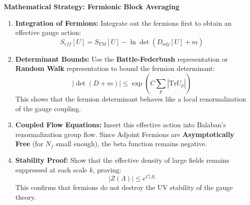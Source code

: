 \textbf{Mathematical Strategy: Fermionic Block Averaging}
\begin{enumerate}
    \item \textbf{Integration of Fermions:}
    Integrate out the fermions first to obtain an effective gauge action:
    \begin{equation}
    S_{eff}[U] = S_{YM}[U] - \ln \det(D_{adj}[U] + m)
    \end{equation}
    
    \item \textbf{Determinant Bounds:}
    Use the \textbf{Battle-Federbush} representation or \textbf{Random Walk} representation to bound the fermion determinant:
    \begin{equation}
    |\det(D+m)| \le \exp\left( C \sum_p |\text{Tr} U_p| \right)
    \end{equation}
    This shows that the fermion determinant behaves like a local renormalization of the gauge coupling.
    
    \item \textbf{Coupled Flow Equations:}
    Insert this effective action into Balaban's renormalization group flow. Since Adjoint Fermions are \textbf{Asymptotically Free} (for $N_f$ small enough), the beta function remains negative.
    
    \item \textbf{Stability Proof:}
    Show that the effective density of large fields remains suppressed at each scale $k$, proving:
    \begin{equation}
    |Z(\Lambda)| \le e^{C |\Lambda|}
    \end{equation}
    This confirms that fermions do not destroy the UV stability of the gauge theory.
\end{enumerate}


